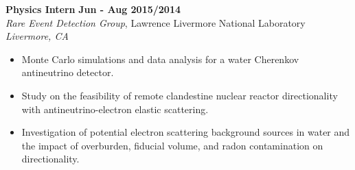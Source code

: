 \textbf{Physics Intern} \hfill \textbf{Jun - Aug 2015/2014} \\
\textsl{Rare Event Detection Group}, Lawrence Livermore National Laboratory \hfill \textsl{Livermore, CA} \\[-2.8ex]
\vspace{2pt}
\begin{itemize}[leftmargin=4ex] \itemsep -2pt
    \item Monte Carlo simulations and data analysis for a water Cherenkov antineutrino detector.
    \item Study on the feasibility of remote clandestine nuclear reactor directionality with antineutrino-electron elastic scattering.
    \item Investigation of potential electron scattering background sources in water and the impact of overburden, fiducial volume, and radon contamination on directionality.
\end{itemize}

